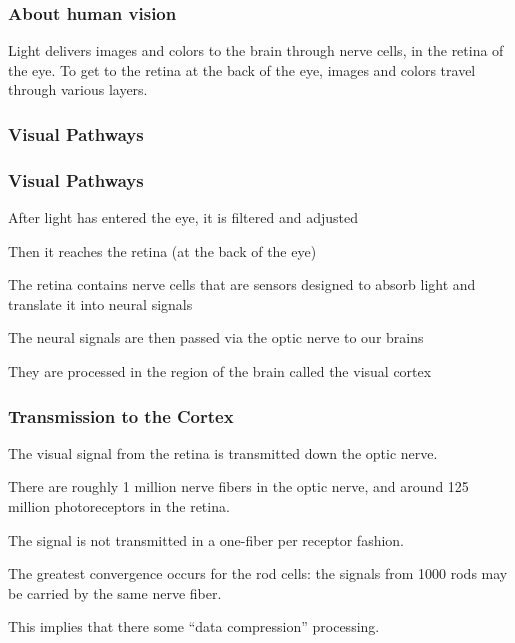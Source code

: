 \documentclass[12pt]{beamer}\usepackage[]{graphicx}\usepackage[]{color}
\begin{document}

\begin{frame}
\frametitle{About human vision}

Light delivers images and colors to the brain through nerve cells,
in the retina of the eye. To get to the retina at the back of the eye, images
and colors travel through various layers.
\eb

\end{frame}



\begin{frame}
\begin{center}
\Huge{}
\end{center}
\end{frame}


\begin{frame}
\frametitle{Visual Pathways}
\begin{center}
\end{center}
\end{frame}


\begin{frame}
\frametitle{Visual Pathways}

\bbi
  \item After light has entered the eye, it is filtered and adjusted
  \item Then it reaches the retina (at the back of the eye)
  \item The retina contains nerve cells that are sensors designed to absorb
  light and translate it into neural signals
  \item The neural signals are then passed via the optic nerve to our brains
  \item They are processed in the region of the brain called the visual cortex
\ei

\end{frame}


\begin{frame}
\frametitle{Transmission to the Cortex}

\bbi
  \item The visual signal from the retina is transmitted down the optic nerve.
  \item There are roughly 1 million nerve fibers in the optic nerve, and around
  125 million photoreceptors in the retina.
  \item The signal is not transmitted in a one-fiber per receptor fashion.
  \item The greatest convergence occurs for the rod cells: the signals from 
  1000 rods may be carried by the same nerve fiber.
  \item This implies that there some ``data compression'' processing.
\ei

\end{frame}
\end{document}
